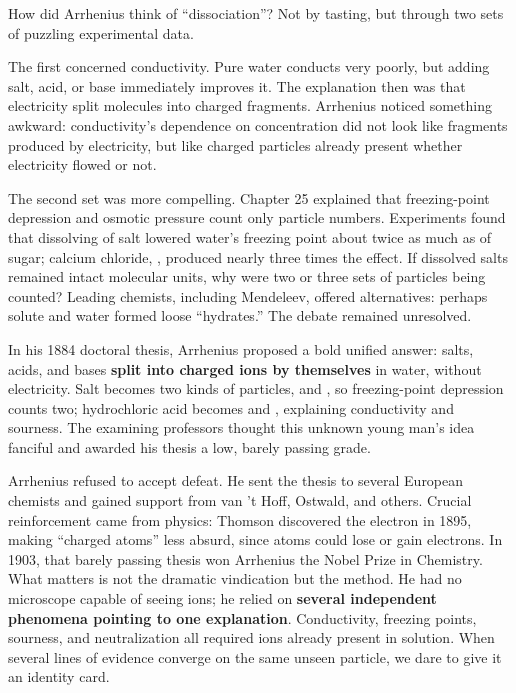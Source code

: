 \begin{zhengju}
How did Arrhenius think of ``dissociation''? Not by tasting, but through two sets of puzzling experimental data.

The first concerned conductivity. Pure water conducts very poorly, but adding salt, acid, or base immediately improves it. The explanation then was that electricity split molecules into charged fragments. Arrhenius noticed something awkward: conductivity's dependence on concentration did not look like fragments produced by electricity, but like charged particles already present whether electricity flowed or not.

The second set was more compelling. Chapter 25 explained that freezing-point depression and osmotic pressure count only particle numbers. Experiments found that dissolving  of salt lowered water's freezing point about twice as much as  of sugar; calcium chloride, , produced nearly three times the effect. If dissolved salts remained intact molecular units, why were two or three sets of particles being counted? Leading chemists, including Mendeleev, offered alternatives: perhaps solute and water formed loose ``hydrates.'' The debate remained unresolved.

In his 1884 doctoral thesis, Arrhenius proposed a bold unified answer: salts, acids, and bases \textbf{split into charged ions by themselves} in water, without electricity. Salt becomes two kinds of particles,  and , so freezing-point depression counts two; hydrochloric acid becomes  and , explaining conductivity and sourness. The examining professors thought this unknown young man's idea fanciful and awarded his thesis a low, barely passing grade.

Arrhenius refused to accept defeat. He sent the thesis to several European chemists and gained support from van 't Hoff, Ostwald, and others. Crucial reinforcement came from physics: Thomson discovered the electron in 1895, making ``charged atoms'' less absurd, since atoms could lose or gain electrons. In 1903, that barely passing thesis won Arrhenius the Nobel Prize in Chemistry. What matters is not the dramatic vindication but the method. He had no microscope capable of seeing ions; he relied on \textbf{several independent phenomena pointing to one explanation}. Conductivity, freezing points, sourness, and neutralization all required ions already present in solution. When several lines of evidence converge on the same unseen particle, we dare to give it an identity card.
\end{zhengju}

